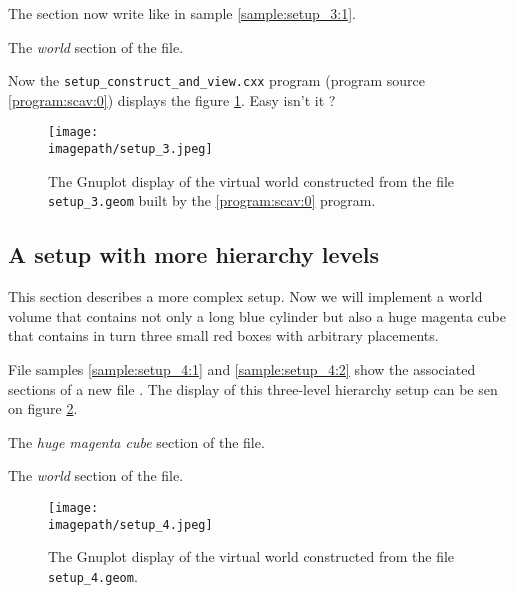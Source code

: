 The  section now write like in sample \ref{sample:setup_3:1}.
\begin{sample}[h]
\caption{The \emph{world} section of the  file.}
\label{sample:setup_3:1}
\end{sample}

Now the \texttt{setup\_construct\_and\_view.cxx} program (program source 
\ref{program:scav:0}) displays the figure \ref{fig:setup_3:0}.
Easy isn't it ?

\begin{figure}[h]
\begin{center}
\texttt{[image: \\imagepath/setup\_3.jpeg]}
\end{center}
\caption{The Gnuplot  display of the  virtual world constructed
  from   the   file   \texttt{setup\_3.geom}  built   by   the
  \ref{program:scav:0} program.}\label{fig:setup_3:0}
\end{figure}

\clearpage

\subsection{A setup with more hierarchy levels}

This section describes a more complex setup. Now we will implement a
world volume that contains not only a long blue cylinder but also
a huge magenta cube that contains in turn three small red boxes
with arbitrary placements. 

File samples \ref{sample:setup_4:1} and \ref{sample:setup_4:2}
show the associated sections of a new file .
The display of this three-level hierarchy setup can be sen on figure \ref{fig:setup_4:0}.

\begin{sample}[h]
\caption{The \emph{huge magenta cube}
  section of the   file.}
\label{sample:setup_4:1}
\end{sample}

\begin{sample}[h]
\caption{The \emph{world} section of the  file.}
\label{sample:setup_4:2}
\end{sample}

\begin{figure}[h]
\begin{center}
\texttt{[image: \\imagepath/setup\_4.jpeg]}
\end{center}
\caption{The Gnuplot  display of the  virtual world constructed
  from   the   file   \texttt{setup\_4.geom}.}\label{fig:setup_4:0}
\end{figure}

\clearpage


